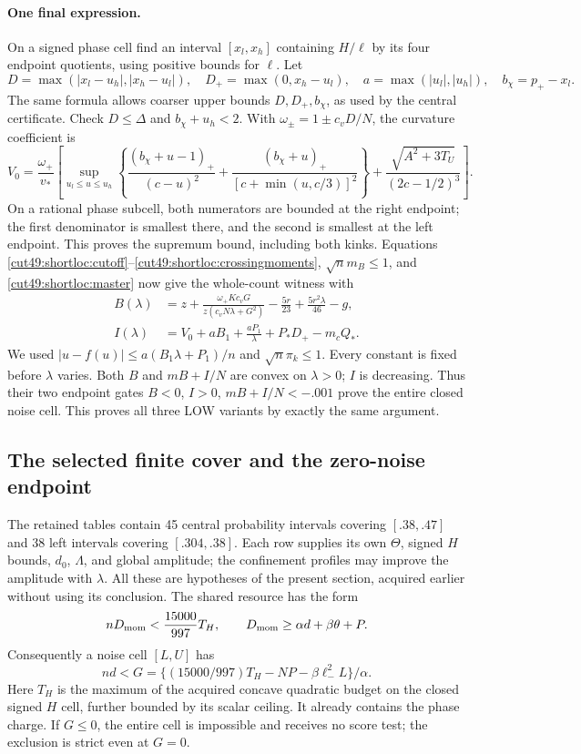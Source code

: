 \documentclass[11pt,a4paper]{article}
\numberwithin{equation}{section}
\theoremstyle{definition}
\theoremstyle{remark}
\begin{document}
\paragraph{One final expression.}
On a signed phase cell find an interval $[x_l,x_h]$ containing $H/\ell$
by its four endpoint quotients, using positive bounds for $\ell$.
Let
\[
 D=\max(|x_l-u_h|,|x_h-u_l|),\quad
 D_+=\max(0,x_h-u_l),\quad a=\max(|u_l|,|u_h|),\quad b_\chi=p_+-x_l.
\]
The same formula allows coarser upper bounds $D,D_+,b_\chi$, as used by
the central certificate. Check $D\le\Delta$ and $b_\chi+u_h<2$.
With $\omega_\pm=1\pm c_vD/N$, the curvature coefficient is
\begin{equation}\label{cut49:shortloc:V}
 V_0=\frac{\omega_+}{v_*}\left[
 \sup_{u_l\le u\le u_h}\left\{
 \frac{(b_\chi+u-1)_+}{(c-u)^2}
 +\frac{(b_\chi+u)_+}{[c+\min(u,c/3)]^2}\right\}
 +\frac{\sqrt{A^2+3T_U}}{(2c-1/2)^3}\right].
\end{equation}
On a rational phase subcell, both numerators are bounded at the right
endpoint; the first denominator is smallest there, and the second is
smallest at the left endpoint. This proves the supremum bound, including
both kinks. Equations \eqref{cut49:shortloc:cutoff}--\eqref{cut49:shortloc:crossingmoments},
$\sqrt n m_B\le1$, and \eqref{cut49:shortloc:master} now give the whole-count
witness with
\begin{align}\label{cut49:shortloc:BI}
 B(\lambda)&=z+\frac{\omega_+Kc_vG}{z(c_vN\lambda+G^2)}
                      -\frac{5r}{23}+\frac{5r^2\lambda}{46}-g,\\
 I(\lambda)&=V_0+aB_1+\frac{aP_1}{\lambda}+P_*D_+-m_cQ_*.
 \nonumber
\end{align}
We used $|u-f(u)|\le a(B_1\lambda+P_1)/n$ and $\sqrt n\pi_k\le1$.
Every constant is fixed before $\lambda$ varies. Both $B$ and
$mB+I/N$ are convex on $\lambda>0$; $I$ is decreasing. Thus their two
endpoint gates $B<0$, $I>0$, $mB+I/N<-.001$ prove the entire closed noise
cell. This proves all three LOW variants by exactly the same argument.

\subsection{The selected finite cover and the zero-noise endpoint}

The retained tables contain 45 central probability intervals covering
$[.38,.47]$ and 38 left intervals covering $[.304,.38]$. Each row supplies
its own $\Theta$, signed $H$ bounds, $d_0$, $\Lambda$, and global amplitude;
the confinement profiles may improve the amplitude with $\lambda$.
All these are hypotheses of the present section, acquired earlier without
using its conclusion. The shared resource has the form
\[
 nD_{\rm mom}<\frac{15000}{997}T_H,\qquad
 D_{\rm mom}\ge\alpha d+\beta\theta+P.
\]
Consequently a noise cell $[L,U]$ has
\[
 nd<G=\{(15000/997)T_H-NP-\beta\ell_-^2L\}/\alpha.
\]
Here $T_H$ is the maximum of the acquired concave quadratic budget on the
closed signed $H$ cell, further bounded by its scalar ceiling. It already
contains the phase charge. If $G\le0$, the entire cell is impossible and
receives no score test; the exclusion is strict even at $G=0$.
\end{document}
